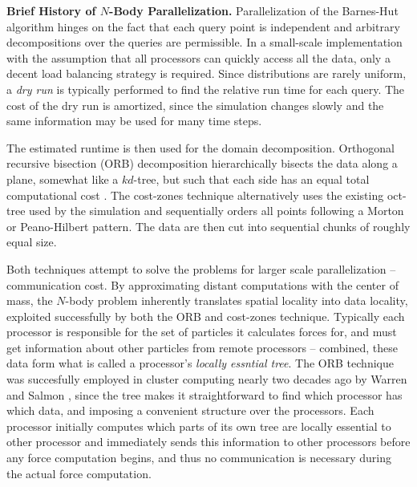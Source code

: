 \documentclass[times, leqno,twocolumn]{article}
\begin{document}

{\bf Brief History of $N$-Body Parallelization.}
Parallelization of the Barnes-Hut algorithm hinges on the fact that each query point is independent and arbitrary decompositions over the queries are permissible.
In a small-scale implementation with the assumption that all processors can quickly access all the data, only a decent load balancing strategy is required.
Since distributions are rarely uniform, a {\it dry run} is typically performed to find the relative run time for each query.
The cost of the dry run is amortized, since the simulation changes slowly and the same information may be used for many time steps.

The estimated runtime is then used for the domain decomposition.
Orthogonal recursive bisection (ORB) decomposition hierarchically bisects the data along a plane, somewhat like a $kd$-tree, but such that each side has an equal total computational cost \cite{singh95load, liu94experiences, warren93parallel}.
The cost-zones technique alternatively uses the existing oct-tree used by the simulation and sequentially orders all points following a Morton or Peano-Hilbert pattern.
The data are then cut into sequential chunks of roughly equal size.

Both techniques attempt to solve the problems for larger scale parallelization -- communication cost.
By approximating distant computations with the center of mass, the $N$-body problem inherently translates spatial locality into data locality, exploited successfully by both the ORB and cost-zones technique.
Typically each processor is responsible for the set of particles it calculates forces for, and must get information about other particles from remote processors -- combined, these data form what is called a processor's {\it locally essntial tree}.
The ORB technique was succesfully employed in cluster computing nearly two decades ago by Warren and Salmon \cite{warren92astrophysical}, since the tree makes it straightforward to find which processor has which data, and imposing a convenient structure over the processors.
Each processor initially computes which parts of its own tree are locally essential to other processor and immediately sends this information to other processors before any force computation begins, and thus no communication is necessary during the actual force computation.
\end{document}

